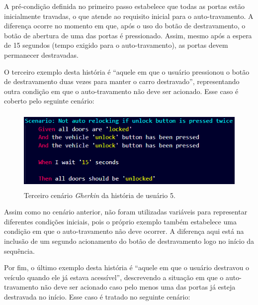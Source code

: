 A pré-condição definida no primeiro passo estabelece que todas as portas estão inicialmente travadas, o que atende ao requisito inicial para o auto-travamento. 
A diferença ocorre no momento em que, após o uso do botão de destravamento, o botão de abertura de uma das portas é pressionado. Assim, mesmo após a espera de 
15 segundos (tempo exigido para o auto-travamento), as portas devem permanecer destravadas.

O terceiro exemplo desta história é ``aquele em que o usuário pressionou o botão de destravamento duas vezes para manter o carro destravado'', representando 
outra condição em que o auto-travamento não deve ser acionado. Esse caso é coberto pelo seguinte cenário:




\begin{figure}[H]
\centering
\includegraphics[height=4cm]{figuras/cenarios/h5c3.png}
\caption{Terceiro cenário \textit{Gherkin} da história de usuário 5.}
\label{fig:h5c3}
\end{figure}

Assim como no cenário anterior, não foram utilizadas variáveis para representar diferentes condições iniciais, pois o próprio exemplo também estabelece uma condição 
em que o auto-travamento não deve ocorrer. A diferença aqui está na inclusão de um segundo acionamento do botão de destravamento logo no início da sequência.

Por fim, o último exemplo desta história é ``aquele em que o usuário destravou o veículo quando ele já estava acessível'', descrevendo a situação em que o auto-travamento 
não deve ser acionado caso pelo menos uma das portas já esteja destravada no início. Esse caso é tratado no seguinte cenário:

